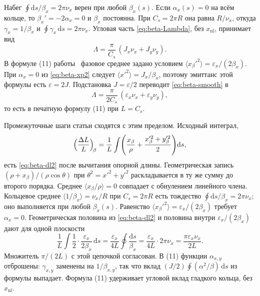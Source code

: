 Набег $\oint\mathrm{d}s/\beta_x=2\pi\nu_x$ верен при любой $\beta_x(s)$. Если $\alpha_x(s)=0$ на всём кольце, то $\beta_x'=-2\alpha_x=0$ и $\beta_x$ постоянна. При $C_s=2\pi R$ она равна $R/\nu_x$, откуда $\gamma_x=1/\beta_x$ и $\oint\gamma_x\,\mathrm{d}s=2\pi\nu_x$. Угловая часть \eqref{eq:beta-Lambda}, без $x_{\mathrm{nl}}$, принимает вид
\begin{equation}
\label{eq:beta-smooth}
\Lambda=\frac{\pi}{C_s}\,(J_x\nu_x+J_y\nu_y).
\end{equation}
В формуле (11) работы~\cite{Senichev2013} фазовое среднее задано условием $\langle x_\beta'^2\rangle=\varepsilon_x/(2\beta_x)$. При $\alpha_x=0$ из \eqref{eq:beta-xp2} следует $\langle x'^2\rangle=J_x/\beta_x$, поэтому эмиттанс этой формулы есть $\varepsilon=2J$. Подстановка $J=\varepsilon/2$ переводит \eqref{eq:beta-smooth} в
\begin{equation}
\label{eq:beta-11}
\Lambda=\frac{\pi}{2C_s}\,(\varepsilon_x\nu_x+\varepsilon_y\nu_y),
\end{equation}
то есть в печатную формулу (11) при $L=C_s$.

Промежуточные шаги статьи сходятся с этим пределом. Исходный интеграл,
\begin{equation}
\label{eq:beta-sen-int}
\Bigl(\frac{\Delta L}{L}\Bigr)_{\!\beta}
=\frac{1}{L}\int\Biggl(
\frac{x_\beta}{\rho}+\frac{x_\beta'^2+y_\beta'^2}{2}
\Biggr)\mathrm{d}s,
\end{equation}
есть \eqref{eq:beta-dl2} после вычитания опорной длины. Геометрическая запись $(\rho+x_\beta)/(\rho\cos\theta)$ при $\theta^2=x'^2+y'^2$ раскладывается в ту же сумму до второго порядка. Среднее $\langle x_\beta/\rho\rangle=0$ совпадает с обнулением линейного члена. Кольцевое среднее $\langle 1/\beta_x\rangle=\nu_x/R$ при $C_s=2\pi R$ есть тождество $\oint\mathrm{d}s/\beta_x=2\pi\nu_x$; оно выполняется при любой $\beta_x(s)$. Равенство $\langle x_\beta'^2\rangle=\varepsilon_x/(2\beta_x)$ требует $\alpha_x=0$. Геометрическая половина из \eqref{eq:beta-dl2} и половина внутри $\varepsilon_x/(2\beta_x)$ дают для одной плоскости
\begin{equation}
\label{eq:beta-half}
\frac{1}{L}\int\frac12\cdot\frac{\varepsilon_x}{2\beta_x}\,\mathrm{d}s
=\frac{\varepsilon_x}{4L}\oint\frac{\mathrm{d}s}{\beta_x}
=\frac{\varepsilon_x}{4L}\cdot 2\pi\nu_x
=\frac{\pi\varepsilon_x\nu_x}{2L}.
\end{equation}
Множитель $\pi/(2L)$ с этой цепочкой согласован. В (11) функции $\alpha_{x,y}$ отброшены: $\gamma_{x,y}$ заменены на $1/\beta_{x,y}$, так что вклад $(J/2)\oint(\alpha^2/\beta)\,\mathrm{d}s$ из формулы выпадает. Формула (11) удерживает угловой вклад гладкого кольца, без $x_{\mathrm{nl}}$.

